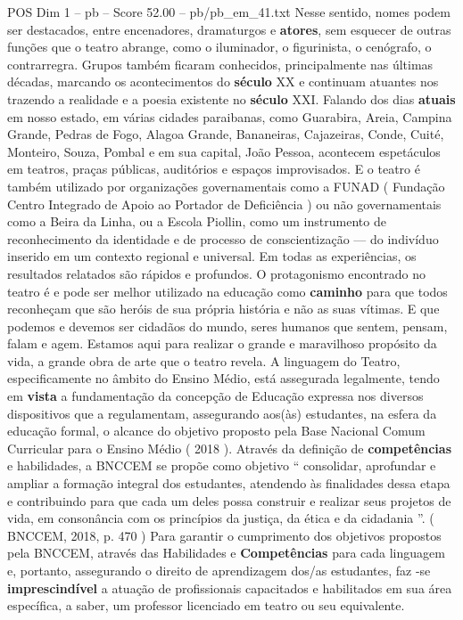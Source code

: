 \begin{textsample}{POS Dim 1 – pb – Score 52.00 – pb/pb\_em\_41.txt}
Nesse sentido, nomes podem ser destacados, entre encenadores, dramaturgos e \textbf{atores}, sem esquecer de outras funções que o teatro abrange, como o iluminador, o figurinista, o cenógrafo, o contrarregra.
Grupos também ficaram conhecidos, principalmente nas últimas décadas, marcando os acontecimentos do \textbf{século} XX e continuam atuantes nos trazendo a realidade e a poesia existente no \textbf{século} XXI.
Falando dos dias \textbf{atuais} em nosso estado, em várias cidades paraibanas, como Guarabira, Areia, Campina Grande, Pedras de Fogo, Alagoa Grande, Bananeiras, Cajazeiras, Conde, Cuité, Monteiro, Souza, Pombal e em sua capital, João Pessoa, acontecem espetáculos em teatros, praças públicas, auditórios e espaços improvisados.
E o teatro é também utilizado por organizações governamentais como a FUNAD ( Fundação Centro Integrado de Apoio ao Portador de Deficiência ) ou não governamentais como a Beira da Linha, ou a Escola Piollin, como um instrumento de reconhecimento da identidade e de processo de conscientização — do indivíduo inserido em um contexto regional e universal.
Em todas as experiências, os resultados relatados são rápidos e profundos.
O protagonismo encontrado no teatro é e pode ser melhor utilizado na educação como \textbf{caminho} para que todos reconheçam que são heróis de sua própria história e não as suas vítimas.
E que podemos e devemos ser cidadãos do mundo, seres humanos que sentem, pensam, falam e agem.
Estamos aqui para realizar o grande e maravilhoso propósito da vida, a grande obra de arte que o teatro revela.
A linguagem do Teatro, especificamente no âmbito do Ensino Médio, está assegurada legalmente, tendo em \textbf{vista} a fundamentação da concepção de Educação expressa nos diversos dispositivos que a regulamentam, assegurando aos(às) estudantes, na esfera da educação formal, o alcance do objetivo proposto pela Base Nacional Comum Curricular para o Ensino Médio ( 2018 ).
Através da definição de \textbf{competências} e habilidades, a BNCCEM se propõe como objetivo “ consolidar, aprofundar e ampliar a formação integral dos estudantes, atendendo às finalidades dessa etapa e contribuindo para que cada um deles possa construir e realizar seus projetos de vida, em consonância com os princípios da justiça, da ética e da cidadania ”. ( BNCCEM, 2018, p. 470 ) Para garantir o cumprimento dos objetivos propostos pela BNCCEM, através das Habilidades e \textbf{Competências} para cada linguagem e, portanto, assegurando o direito de aprendizagem dos/as estudantes, faz -se \textbf{imprescindível} a atuação de profissionais capacitados e habilitados em sua área específica, a saber, um professor licenciado em teatro ou seu equivalente.

\end{textsample}
